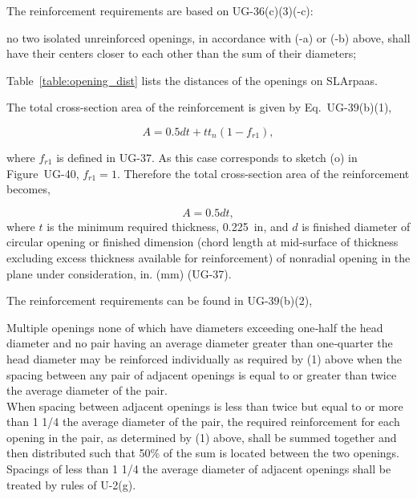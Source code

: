 The reinforcement requirements are based on UG-36(c)(3)(-c):

\begin{displayquote}
    no two isolated unreinforced openings, in accordance with (-a) 
    or (-b) above, shall have their centers closer to each other than 
    the sum of their diameters;
\end{displayquote}

Table~\ref{table:opening_dist} lists the distances of the openings on SLArpaas.



The total cross-section area of the reinforcement is given by 
Eq.~UG-39(b)(1),

\begin{equation}
    A = 0.5dt + tt_n(1-f_{r1}),
\end{equation}

where $f_{r1}$ is defined in UG-37. 
As this case corresponds to sketch (o) in Figure~UG-40,
$f_{r1} = 1$.
Therefore the total cross-section area of the reinforcement becomes,

\begin{equation}
    A = 0.5dt,
\end{equation}
where $t$ is the minimum required thickness, 0.225~in,
and $d$ is finished diameter of circular opening or finished dimension 
(chord length at mid-surface of thickness excluding excess thickness 
available for reinforcement) of nonradial opening in the plane under 
consideration, in. (mm) (UG-37).

The reinforcement requirements can be found in UG-39(b)(2),

\begin{displayquote}
    Multiple openings none of which have diameters exceeding one‐half 
    the head diameter and no pair having an average diameter greater 
    than one‐quarter the head diameter may be reinforced individually 
    as required by (1) above when the spacing between any pair of 
    adjacent openings is equal to or greater than twice the average 
    diameter of the pair.\\

    When spacing between adjacent openings is less than twice but equal 
    to or more than 1 1/4 the average diameter of the pair, the required 
    reinforcement for each opening in the pair, as determined by (1) 
    above, shall be summed together and then distributed such that 50\% 
    of the sum is located between the two openings. 
    Spacings of less than 1 1/4 the average diameter of adjacent openings 
    shall be treated by rules of U-2(g).
\end{displayquote}

